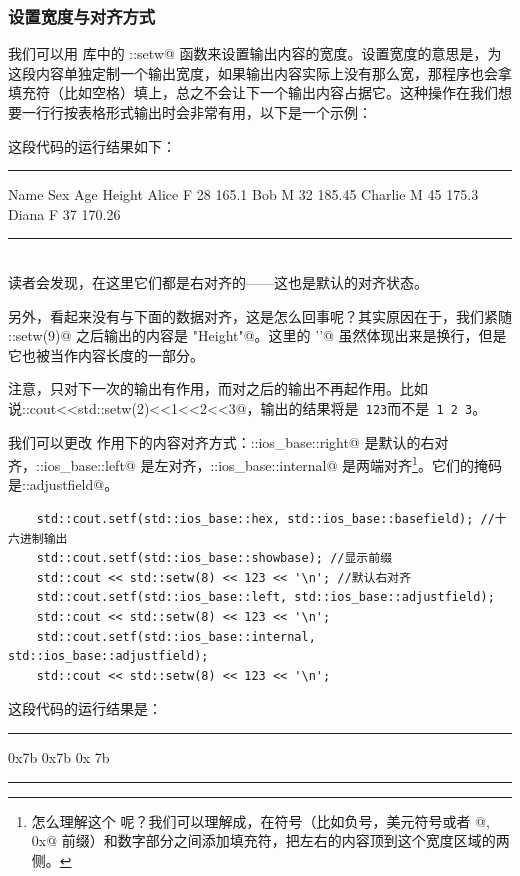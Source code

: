 \subsubsection*{设置宽度与对齐方式}
我们可以用 \lstinline@iomanip@ 库中的 \lstinline@std::setw@ 函数来设置输出内容的宽度。设置宽度的意思是，为这段内容单独定制一个输出宽度，如果输出内容实际上没有那么宽，那程序也会拿填充符（比如空格）填上，总之不会让下一个输出内容占据它。这种操作在我们想要一行行按表格形式输出时会非常有用，以下是一个示例：

这段代码的运行结果如下：\\\noindent\rule{\linewidth}{.2pt}
\begin{verbatim*}
     Name  Sex  Age  Height
    Alice    F   28    165.1
      Bob    M   32   185.45
  Charlie    M   45    175.3
    Diana    F   37   170.26
\end{verbatim*}\noindent\rule{\linewidth}{.2pt}\\
读者会发现，在这里它们都是右对齐的——这也是默认的对齐状态。\par
另外，\lstinline@Height@ 看起来没有与下面的数据对齐，这是怎么回事呢？其实原因在于，我们紧随 \lstinline@std::setw(9)@ 之后输出的内容是 \lstinline@"Height\n"@。这里的 \lstinline@'\n'@ 虽然体现出来是换行，但是它也被当作内容长度的一部分。\par
注意，\lstinline@setw@ 只对下一次的输出有作用，而对之后的输出不再起作用。比如说\linebreak\lstinline@std::cout<<std::setw(2)<<1<<2<<3@，输出的结果将是\texttt{ 123}而不是\texttt{ 1 2 3}。\par
我们可以更改 \lstinline@setw@ 作用下的内容对齐方式：\lstinline@std::ios_base::right@ 是默认的右对齐，\linebreak\lstinline@std::ios_base::left@ 是左对齐，\lstinline@std::ios_base::internal@ 是两端对齐\footnote{怎么理解这个 \lstinline@internal@ 呢？我们可以理解成，在符号（比如负号，美元符号或者 @, \lstinline@0x@ 前缀）和数字部分之间添加填充符，把左右的内容顶到这个宽度区域的两侧。}。它们的掩码是\linebreak\lstinline@std::adjustfield@。
\begin{lstlisting}
    std::cout.setf(std::ios_base::hex, std::ios_base::basefield); //十六进制输出
    std::cout.setf(std::ios_base::showbase); //显示前缀
    std::cout << std::setw(8) << 123 << '\n'; //默认右对齐
    std::cout.setf(std::ios_base::left, std::ios_base::adjustfield);
    std::cout << std::setw(8) << 123 << '\n';
    std::cout.setf(std::ios_base::internal, std::ios_base::adjustfield);
    std::cout << std::setw(8) << 123 << '\n';
\end{lstlisting}
这段代码的运行结果是：\\\noindent\rule{\linewidth}{.2pt}
\begin{verbatim*}
    0x7b
0x7b    
0x    7b
\end{verbatim*}\noindent\rule{\linewidth}{.2pt}
